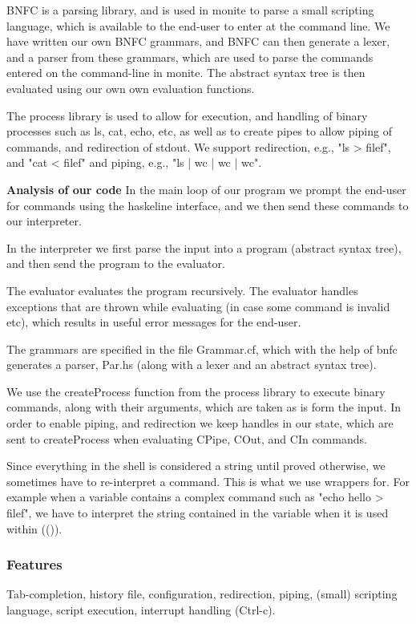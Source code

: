 \documentclass[11pt,a4paper]{article}
\begin{document}
BNFC is a parsing library, and is used in monite to parse a small scripting
language, which is available to the end-user to enter at the command line. We
have written our own BNFC grammars, and BNFC can then generate a lexer, and a
parser from these grammars, which are used to parse the commands entered on the
command-line in monite. The abstract syntax tree is then evaluated using our own
own evaluation functions.

The process library is used to allow for execution, and handling of binary
processes such as ls, cat, echo, etc, as well as to create pipes to allow
piping of commands, and redirection of stdout. We support redirection, e.g.,
"ls > filef", and "cat < filef" and piping, e.g., "ls | wc | wc | wc".

\textbf{Analysis of our code}
In the main loop of our program we prompt the end-user for commands using the
haskeline interface, and we then send these commands to our interpreter.

In the interpreter we first parse the input into a program (abstract syntax
tree), and then send the program to the evaluator.

The evaluator evaluates the program recursively. The evaluator handles
exceptions that are thrown while evaluating (in case some command is invalid
etc), which results in useful error messages for the end-user.

The grammars are specified in the file Grammar.cf, which with the help of bnfc
generates a parser, Par.hs (along with a lexer and an abstract syntax tree).

We use the createProcess function from the process library to execute binary
commands, along with their arguments, which are taken as is form the input. In
order to enable piping, and redirection we keep handles in our state, which are
sent to createProcess when evaluating CPipe, COut, and CIn commands.

Since everything in the shell is considered a string until proved otherwise, we
sometimes have to re-interpret a command. This is what we use wrappers for.  For
example when a variable contains a complex command such as "echo hello > filef",
we have to interpret the string contained in the variable when it is used within
(()).

\subsubsection{Features}
\label{features}
Tab-completion, history file, configuration, redirection, piping, (small)
scripting language, script execution, interrupt handling (Ctrl-c).
\end{document}
